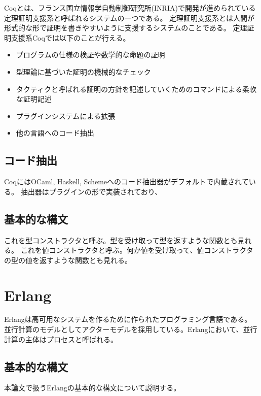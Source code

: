 Coqとは、フランス国立情報学自動制御研究所(INRIA)で開発が進められている定理証明支援系と呼ばれるシステムの一つである。
定理証明支援系とは人間が形式的な形で証明を書きやすいように支援するシステムのことである。
定理証明支援系Coqでは以下のことが行える。

\begin{itemize}
\item プログラムの仕様の検証や数学的な命題の証明
\item 型理論に基づいた証明の機械的なチェック
\item タクティクと呼ばれる証明の方針を記述していくためのコマンドによる柔軟な証明記述
\item プラグインシステムによる拡張
\item 他の言語へのコード抽出
\end{itemize}

\subsection{コード抽出}

CoqにはOCaml, Haskell, Schemeへのコード抽出器がデフォルトで内蔵されている。
抽出器はプラグインの形で実装されており、

\subsection{基本的な構文}

\begin{figure}
\end{figure}
これを型コンストラクタと呼ぶ。型を受け取って型を返すような関数とも見れる。
これを値コンストラクタと呼ぶ。何か値を受け取って、値コンストラクタの型の値を返すような関数とも見れる。

\section{Erlang}

Erlang\cite{erlang}は高可用なシステムを作るために作られたプログラミング言語である。
並行計算のモデルとしてアクターモデルを採用している。Erlangにおいて、並行計算の主体はプロセスと呼ばれる。

\subsection{基本的な構文}

本論文で扱うErlangの基本的な構文について説明する。

